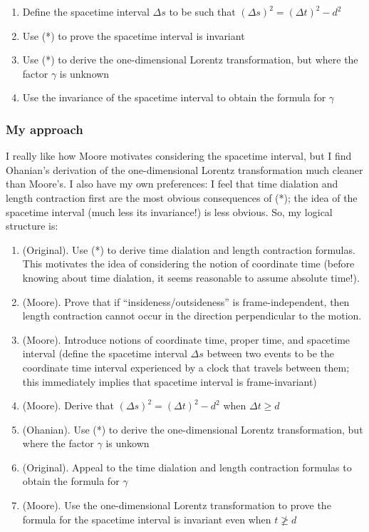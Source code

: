 \documentclass{article}
\begin{document}
\begin{enumerate}
    \item Define the spacetime interval $\Delta s$ to be such that $(\Delta s)^2 = (\Delta t)^2 - d^2$
    \item Use (*) to prove the spacetime interval is invariant
    \item Use (*) to derive the one-dimensional Lorentz transformation, but where the factor $\gamma$ is unknown
    \item Use the invariance of the spacetime interval to obtain the formula for $\gamma$
\end{enumerate}

\newpage

\subsubsection*{My approach}

I really like how Moore motivates considering the spacetime interval, but I find Ohanian's derivation of the one-dimensional Lorentz transformation much cleaner than Moore's. I also have my own preferences: I feel that time dialation and length contraction first are the most obvious consequences of (*); the idea of the spacetime interval (much less its invariance!) is less obvious. So, my logical structure is:

\begin{enumerate}
    \item (Original). Use (*) to derive time dialation and length contraction formulas. This motivates the idea of considering the notion of coordinate time (before knowing about time dialation, it seems reasonable to assume absolute time!).
    \item (Moore). Prove that if ``insideness/outsideness'' is frame-independent, then length contraction cannot occur in the direction perpendicular to the motion.
    \item (Moore). Introduce notions of coordinate time, proper time, and spacetime interval (define the spacetime interval $\Delta s$ between two events to be the coordinate time interval experienced by a clock that travels between them; this immediately implies that spacetime interval is frame-invariant)
    \item (Moore). Derive that $(\Delta s)^2 = (\Delta t)^2 - d^2$ when $\Delta t \geq d$
    \item (Ohanian). Use (*) to derive the one-dimensional Lorentz transformation, but where the factor $\gamma$ is unkown
    \item (Original). Appeal to the time dialation and length contraction formulas to obtain the formula for $\gamma$
    \item (Moore). Use the one-dimensional Lorentz transformation to prove the formula for the spacetime interval is invariant even when $t \ngeq d$
\end{enumerate}
\end{document}
